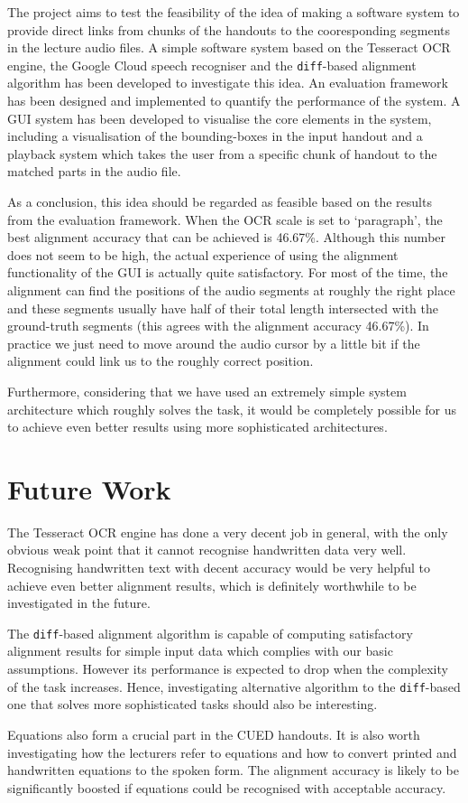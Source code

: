 The project aims to test the feasibility of the idea of making a software system to provide direct links from chunks of the handouts to the cooresponding segments in the lecture audio files. A simple software system based on the Tesseract OCR engine, the Google Cloud speech recogniser and the \texttt{diff}-based alignment algorithm has been developed to investigate this idea. An evaluation framework has been designed and implemented to quantify the performance of the system. A GUI system has been developed to visualise the core elements in the system, including a visualisation of the bounding-boxes in the input handout and a playback system which takes the user from a specific chunk of handout to the matched parts in the audio file.

As a conclusion, this idea should be regarded as feasible based on the results from the evaluation framework. When the OCR scale is set to `paragraph', the best alignment accuracy that can be achieved is 46.67\%. Although this number does not seem to be high, the actual experience of using the alignment functionality of the GUI is actually quite satisfactory. For most of the time, the alignment can find the positions of the audio segments at roughly the right place and these segments usually have half of their total length intersected with the ground-truth segments (this agrees with the alignment accuracy 46.67\%). In practice we just need to move around the audio cursor by a little bit if the alignment could link us to the roughly correct position.

Furthermore, considering that we have used an extremely simple system architecture which roughly solves the task, it would be completely possible for us to achieve even better results using more sophisticated architectures. 

\section{Future Work}

The Tesseract OCR engine has done a very decent job in general, with the only obvious weak point that it cannot recognise handwritten data very well. Recognising handwritten text with decent accuracy would be very helpful to achieve even better alignment results, which is definitely worthwhile to be investigated in the future.

The \texttt{diff}-based alignment algorithm is capable of computing satisfactory alignment results for simple input data which complies with our basic assumptions. However its performance is expected to drop when the complexity of the task increases. Hence, investigating alternative algorithm to the \texttt{diff}-based one that solves more sophisticated tasks should also be interesting.

Equations also form a crucial part in the CUED handouts. It is also worth investigating how the lecturers refer to equations and how to convert printed and handwritten equations to the spoken form. The alignment accuracy is likely to be significantly boosted if equations could be recognised with acceptable accuracy.

